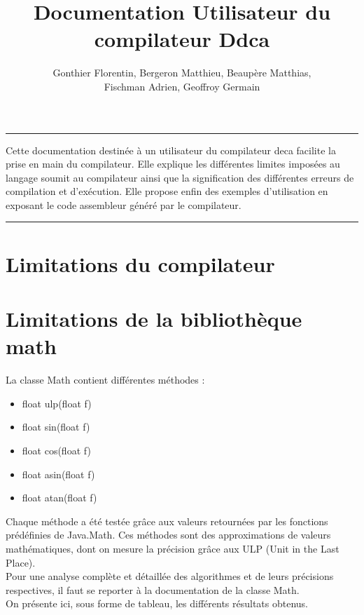 \documentclass[a4,12pt]{article}
\begin{document}
\begin{titlepage}
\title{ Documentation Utilisateur du compilateur Ddca}
\author{Gonthier Florentin, Bergeron Matthieu, Beaupère Matthias,\\ Fischman Adrien, Geoffroy Germain}
\date{}

\maketitle

\rule[0.5ex]{\textwidth}{0.2mm}
Cette documentation destinée à un utilisateur du compilateur deca facilite la prise en main du compilateur.
Elle explique les différentes limites imposées au langage soumit au compilateur ainsi que la signification des
différentes erreurs de compilation et d'exécution. Elle propose enfin des exemples d'utilisation en exposant
le code assembleur généré par le compilateur.

\rule[0.5ex]{\textwidth}{0.2mm}

\end{titlepage}
\tableofcontents
\newpage

\section{Limitations du compilateur}

\section{Limitations de la bibliothèque math}
La classe Math contient différentes méthodes :
\begin{itemize}
    \item float ulp(float f)
    \item float sin(float f)
    \item float cos(float f)
    \item float asin(float f)
    \item float atan(float f)
\end{itemize}
Chaque méthode a été testée grâce aux valeurs retournées par les fonctions prédéfinies de Java.Math. Ces méthodes sont des approximations de valeurs mathématiques, dont on mesure la précision grâce aux ULP (Unit in the Last Place).\\
Pour une analyse complète et détaillée des algorithmes et de leurs précisions respectives, il faut se reporter à la documentation de la classe Math. \\
On présente ici, sous forme de tableau, les différents résultats obtenus.
\end{document}
